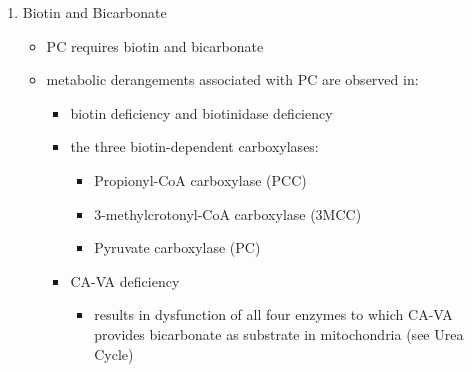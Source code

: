 \documentclass{scrartcl}
\begin{document}
\begin{enumerate}
\item Biotin and Bicarbonate
\label{sec:orga43be93}
\begin{itemize}
\item PC requires biotin and bicarbonate
\item metabolic derangements associated with PC are observed in:
\begin{itemize}
\item biotin deficiency and biotinidase deficiency
\item the three biotin-dependent carboxylases:
\begin{itemize}
\item Propionyl-CoA carboxylase (PCC)
\item 3-methylcrotonyl-CoA carboxylase (3MCC)
\item Pyruvate carboxylase (PC)
\end{itemize}

\item CA-VA deficiency
\begin{itemize}
\item results in dysfunction of all four enzymes to which CA-VA
provides bicarbonate as substrate in mitochondria (see Urea Cycle)
\end{itemize}
\end{itemize}
\end{itemize}


\end{enumerate}
\end{document}
